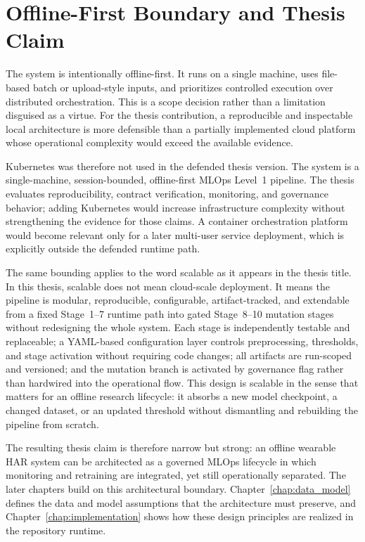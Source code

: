 \section{Offline-First Boundary and Thesis Claim}

The system is intentionally offline-first. It runs on a single machine, uses file-based batch or upload-style inputs, and prioritizes controlled execution over distributed orchestration. This is a scope decision rather than a limitation disguised as a virtue. For the thesis contribution, a reproducible and inspectable local architecture is more defensible than a partially implemented cloud platform whose operational complexity would exceed the available evidence.

Kubernetes was therefore not used in the defended thesis version. The system is a single-machine, session-bounded, offline-first MLOps Level~1 pipeline. The thesis evaluates reproducibility, contract verification, monitoring, and governance behavior; adding Kubernetes would increase infrastructure complexity without strengthening the evidence for those claims. A container orchestration platform would become relevant only for a later multi-user service deployment, which is explicitly outside the defended runtime path.

The same bounding applies to the word scalable as it appears in the thesis title. In this thesis, scalable does not mean cloud-scale deployment. It means the pipeline is modular, reproducible, configurable, artifact-tracked, and extendable from a fixed Stage~1--7 runtime path into gated Stage~8--10 mutation stages without redesigning the whole system. Each stage is independently testable and replaceable; a YAML-based configuration layer controls preprocessing, thresholds, and stage activation without requiring code changes; all artifacts are run-scoped and versioned; and the mutation branch is activated by governance flag rather than hardwired into the operational flow. This design is scalable in the sense that matters for an offline research lifecycle: it absorbs a new model checkpoint, a changed dataset, or an updated threshold without dismantling and rebuilding the pipeline from scratch.

The resulting thesis claim is therefore narrow but strong: an offline wearable HAR system can be architected as a governed MLOps lifecycle in which monitoring and retraining are integrated, yet still operationally separated. The later chapters build on this architectural boundary. Chapter~\ref{chap:data_model} defines the data and model assumptions that the architecture must preserve, and Chapter~\ref{chap:implementation} shows how these design principles are realized in the repository runtime.
